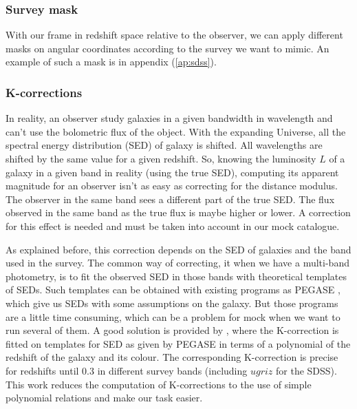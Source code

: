 \subsubsection{Survey mask}
%
With our frame in redshift space relative to the observer, we can apply
different masks on angular coordinates according to the survey we want to
mimic. An example of such a mask is in appendix (\ref{ap:sdss}).
%
\subsubsection{K-corrections}
%
In reality, an observer study galaxies in a given bandwidth in wavelength and
can't use the bolometric flux of the object. With the expanding Universe, all
the spectral energy distribution (SED) of galaxy is shifted. All wavelengths
are shifted by the same value for a given redshift. So, knowing the luminosity
$L$ of a galaxy in a given band in reality (using the true SED), computing its
apparent magnitude for an observer isn't as easy as correcting for the distance
modulus. The observer in the same band sees a different part of the true SED\@.
The flux observed in the same band as the true flux is maybe higher or lower. A
correction for this effect is needed and must be taken into account in our mock
catalogue.

As explained before, this correction depends on the SED of galaxies and the
band used in the survey. The common way of correcting, it when we have a
multi-band photometry, is to fit the observed SED in those bands with
theoretical templates of SEDs. Such templates can be obtained with existing
programs as PEGASE , which give us SEDs with some
assumptions on the galaxy. But those programs are a little time consuming,
which can be a problem for mock when we want to run several of them. A good
solution is provided by \citet{CMAZ10}, where the K-correction is fitted on
templates for SED as given by PEGASE in terms of a polynomial of the
redshift of the galaxy and its colour. The corresponding K-correction is
precise for redshifts until 0.3 in different survey bands (including $ugriz$
for the SDSS). This work reduces the computation of K-corrections to the use
of simple polynomial relations and make our task easier.

